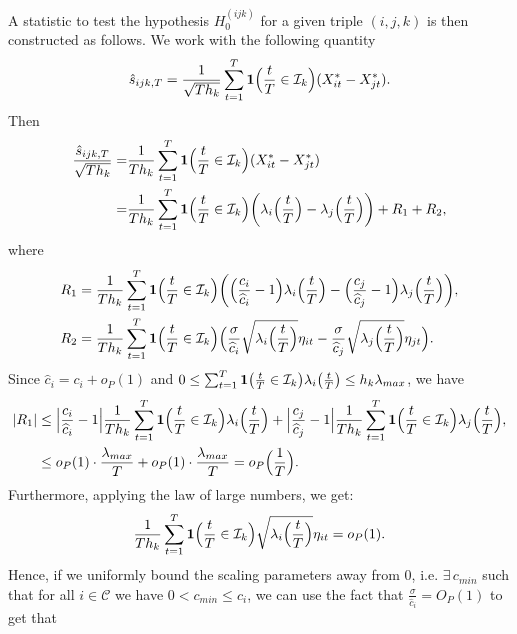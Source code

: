 \documentclass[a4paper,11pt]{article}
\numberwithin{equation}{section}
\begin{document}
A statistic to test the hypothesis $H_0^{(ijk)}$ for a given triple $(i,j,k)$ is then constructed as follows. We work with the following quantity
\[ \hat{s}_{ijk,T} = \frac{1}{\sqrt{Th_k}} \sum\limits_{t=1}^T \boldsymbol{1}\Big(\frac{t}{T} \in \mathcal{I}_k\Big) (X_{it}^* - X_{jt}^*). \]
Then
\begin{align*}
\frac{\hat{s}_{ijk,T}}{\sqrt{Th_k}} =& \frac{1}{Th_k} \sum\limits_{t=1}^T \boldsymbol{1}\Big(\frac{t}{T} \in \mathcal{I}_k\Big) (X_{it}^* - X_{jt}^*)\\
=& \frac{1}{Th_k} \sum\limits_{t=1}^T \boldsymbol{1}\Big(\frac{t}{T} \in \mathcal{I}_k\Big) \bigg( \lambda_i \Big(\frac{t}{T}\Big)  - \lambda_j \Big(\frac{t}{T}\Big)\bigg) + R_1 + R_2,
\end{align*}
where
\begin{align*}
R_1 &= \frac{1}{Th_k} \sum\limits_{t=1}^T \boldsymbol{1}\Big(\frac{t}{T} \in \mathcal{I}_k\Big) \bigg( \Big(\frac{c_i}{\widehat{c}_i} - 1 \Big) \lambda_i \Big(\frac{t}{T}\Big)  - \Big(\frac{c_j}{\widehat{c}_j} - 1 \Big) \lambda_j \Big(\frac{t}{T}\Big)\bigg),\\
R_2& =  \frac{1}{Th_k} \sum\limits_{t=1}^T \boldsymbol{1}\Big(\frac{t}{T} \in \mathcal{I}_k\Big) \Big( \frac{\sigma}{\widehat{c}_i} \sqrt{\lambda_i\Big(\frac{t}{T}\Big)} \eta_{it} - \frac{\sigma}{\widehat{c}_j} \sqrt{\lambda_j\Big(\frac{t}{T}\Big)} \eta_{jt} \Big).
\end{align*}
Since $\widehat{c}_i = c_i + o_P(1)$ and $0 \leq  \sum\nolimits_{t=1}^T \boldsymbol{1}\big(\frac{t}{T} \in \mathcal{I}_k\big) \lambda_i \big(\frac{t}{T}\big) \leq h_k \lambda_{max}$, we have
\begin{align}\label{eq:aux1}
|R_1| &\leq \Big|\frac{c_i}{\widehat{c}_i} - 1 \Big| \frac{1}{Th_k} \sum\limits_{t=1}^T \boldsymbol{1}\Big(\frac{t}{T} \in \mathcal{I}_k\Big) \lambda_i \Big(\frac{t}{T}\Big)  + \Big|\frac{c_j}{\widehat{c}_j} - 1 \Big| \frac{1}{Th_k} \sum\limits_{t=1}^T \boldsymbol{1}\Big(\frac{t}{T} \in \mathcal{I}_k\Big) \lambda_j \Big(\frac{t}{T}\Big),\nonumber \\
&\leq o_P(1) \cdot \frac{\lambda_{max}}{T} + o_P(1) \cdot \frac{\lambda_{max}}{T} = o_P\Big(\frac{1}{T}\Big).
\end{align}
Furthermore, applying the law of large numbers, we get:
\begin{align*}
 \frac{1}{Th_k} \sum\limits_{t=1}^T \boldsymbol{1}\Big(\frac{t}{T} \in \mathcal{I}_k\Big) \sqrt{\lambda_i\Big(\frac{t}{T}\Big)} \eta_{it}  = o_P(1).
\end{align*}
Hence, if we uniformly bound the scaling parameters away from 0, i.e. $\exists \, c_{min}$ such that for all $i \in \mathcal{C}$ we have $0 < c_{min} \leq c_i$, we can use the fact that $\frac{\sigma}{\widehat{c}_i} = O_P(1)$ to get that
\end{document}
